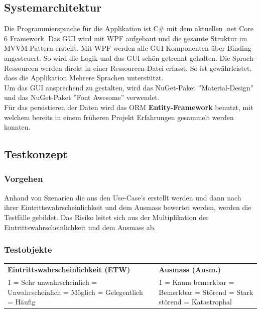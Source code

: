 \subsection{Systemarchitektur}
Die Programmiersprache für die Applikation ist C\# mit dem aktuellen .net Core 6 Framework. Das GUI wird mit WPF aufgebaut und die gesamte Struktur im MVVM-Pattern erstellt. Mit WPF werden alle GUI-Komponenten über Binding angesteuert. So wird die Logik und das GUI schön getrennt gehalten. Die Sprach-Ressourcen werden direkt in einer Ressourcen-Datei erfasst. So ist gewährleistet, dass die Applikation Mehrere Sprachen unterstützt. \\ Um das GUI ansprechend zu gestalten, wird das NuGet-Paket ''Material-Design'' und das NuGet-Paket ''Font Awesome'' verwendet.\\
Für das persistieren der Daten wird das ORM \textbf{Entity-Framework} benutzt, mit welchem bereits in einem früheren Projekt Erfahrungen gesammelt werden konnten.

\newpage
\subsection{Testkonzept} \label{testkonzept}
\subsubsection{Vorgehen}
Anhand von Szenarien die aus den Use-Case's erstellt werden und dann nach ihrer Eintrittswahrscheinlichkeit und dem Ausmass bewertet werden, werden die Testfälle gebildet. Das Risiko leitet sich aus der Multiplikation der Eintrittswahrscheinlichkeit und dem Ausmass ab.
\subsubsection{Testobjekte}
\begin{table}[H]
  \centering
  \setlength\extrarowheight{2pt}
  \begin{tabulary}{1.0\textwidth}{LCL}
    \textbf{Eintrittswahrscheinlichkeit (ETW)} & &
    \textbf{Ausmass (Ausm.)} \\
    1 = Sehr unwahrscheinlich = Unwahrscheinlich = Möglich = Gelegentlich = Häufig && 1 = Kaum bemerkbar = Bemerkbar  = Störend  = Stark störend  = Katastrophal\\
  \end{tabulary}
\end{table}

